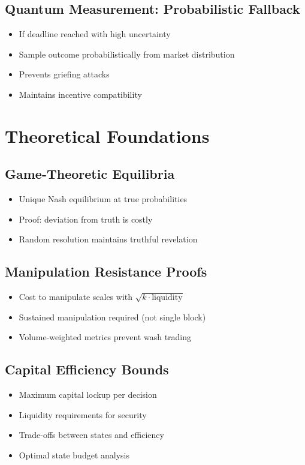 \documentclass{article}
\begin{document}
\subsection{Quantum Measurement: Probabilistic Fallback}
\begin{itemize}
   \item If deadline reached with high uncertainty
   \item Sample outcome probabilistically from market distribution
   \item Prevents griefing attacks
   \item Maintains incentive compatibility
\end{itemize}

\section{Theoretical Foundations}
\subsection{Game-Theoretic Equilibria}
\begin{itemize}
   \item Unique Nash equilibrium at true probabilities
   \item Proof: deviation from truth is costly
   \item Random resolution maintains truthful revelation
\end{itemize}

\subsection{Manipulation Resistance Proofs}
\begin{itemize}
   \item Cost to manipulate scales with $\sqrt{k \cdot \text{liquidity}}$
   \item Sustained manipulation required (not single block)
   \item Volume-weighted metrics prevent wash trading
\end{itemize}

\subsection{Capital Efficiency Bounds}
\begin{itemize}
    \item Maximum capital lockup per decision
    \item Liquidity requirements for security
    \item Trade-offs between states and efficiency
    \item Optimal state budget analysis
\end{itemize}
\end{document}
